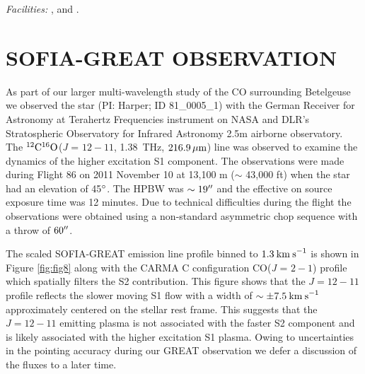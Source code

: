 \documentclass[iop]{emulateapj}
\begin{document}
{\it Facilities:} ,  and .



\appendix
\section{SOFIA-GREAT OBSERVATION}
As part of our larger multi-wavelength study of the CO surrounding Betelgeuse we observed the star (PI: Harper; ID 81\_0005\_1) with the German Receiver for Astronomy at Terahertz Frequencies \cite[GREAT;][]{2000SPIE.4014...23G} instrument on NASA and DLR's Stratospheric Observatory for Infrared Astronomy \cite[SOFIA;][]{2009ASPC..417..101B} 2.5m airborne observatory. The $\rm{^{12}C{}^{16}O}$(\textit{J} = $12-11$, 1.38~THz, $216.9\,\rm \mu m$) line was observed to examine the dynamics of the higher excitation S1 component. The observations were made during Flight 86 on 2011 November 10 at 13,100 m ($\sim$ 43,000 ft) when the star had an elevation of 45$\mbox{$^\circ$}$. The HPBW was $\sim 19\mbox{$^{\prime\prime}$}$ and the effective on source exposure time was 12 minutes. Due to technical difficulties during the flight the observations were obtained using a non-standard asymmetric chop sequence with a throw of $60\mbox{$^{\prime\prime}$}$.

The scaled SOFIA-GREAT emission line profile binned to $1.3\>{\rm km\>s}^{-1}$ is shown in Figure \ref{fig:fig8} along with the CARMA C configuration CO(\textit{J} = $2-1$) profile which spatially filters the S2 contribution. This figure shows that the $\textit{J} = 12-11$ profile reflects the slower moving S1 flow with a width of $\sim \pm 7.5\>{\rm km\>s}^{-1}$ approximately centered on the stellar rest frame. This suggests that the $\textit{J} = 12-11$ emitting plasma is not associated with the faster S2 component and is likely associated with the higher excitation S1 plasma. Owing to uncertainties in the pointing accuracy during our GREAT observation we defer a discussion of the fluxes to a later time. 
\end{document}
